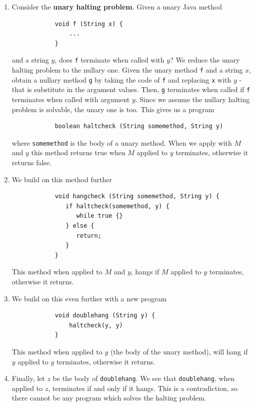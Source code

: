 \documentclass[11pt]{article}
\begin{document}
	\begin{enumerate}
		\item Consider the \textbf{unary halting problem}. Given a unary Java method
		\begin{verbatim}
			void f (String x) {
			    ...
			}
		\end{verbatim}			
		and a string $y$, does \texttt{f} terminate when called with $y$? We reduce the unary halting problem to the nullary one. Given the unary method \texttt{f} and a string $x$, obtain a nullary method \texttt{g} by taking the code of \texttt{f} and replacing \texttt{x} with $y$ - that is substitute in the argument values. Then, \texttt{g} terminates when called if \texttt{f} terminates when called with argument $y$. Since we assume the nullary halting problem is solvable, the unary one is too. This gives us a program
		\begin{verbatim}
			boolean haltcheck (String somemethod, String y)
		\end{verbatim}
		
		where \texttt{somemethod} is the body of a unary method. When we apply with $M$ and $y$ this method returns true when $M$ applied to $y$ terminates, otherwise it returns false.
	
	\item We build on this method further
		\begin{verbatim}
			void hangcheck (String somemethod, String y) {
			   if haltcheck(somemethod, y) {
			      while true {}
			   } else {
			      return;
			   }
			}
		\end{verbatim}	
		
		This method when applied to $M$ and $y$, hangs if $M$ applied to $y$ terminates, otherwise it returns.
				
	\item We build on this even further with a new program
		\begin{verbatim}
			void doublehang (String y) {
			    haltcheck(y, y)
			}
		\end{verbatim}
		
		This method when applied to $y$ (the body of the unary method), will hang if $y$ applied to $y$ terminates, otherwise it returns.
	
	\item Finally, let $z$ be the body of \texttt{doublehang}. We see that \texttt{doublehang}, when applied to $z$, terminates if and only if it hangs. This is a contradiction, so there cannot be any program which solves the halting problem.
	\end{enumerate}
	
\end{document}
